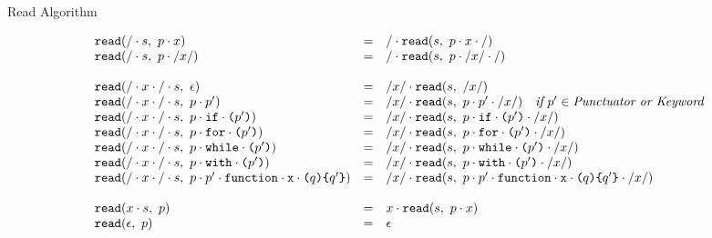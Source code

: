 \documentclass[preprint,10pt]{sigplanconf}
\begin{document}
\begin{displayfigure*}{\label{fig:read}Read Algorithm}
  
\[
  \begin{array}{lcll}
    \texttt{read}(/\cdot s,~p\cdot x)
    &=&
    / \cdot 
      \texttt{read}(s,~
        p\cdot x\cdot /
      )
   
    \\
    \texttt{read}(/\cdot s,~p \cdot /x/)
    &=&
    / \cdot 
      \texttt{read}(s,~
        p \cdot /x/ \cdot /
      )
   

    \\ \\
    \texttt{read}(/\cdot x \cdot /\cdot s,~\epsilon)
    &=&
    /x/ \cdot 
      \texttt{read}(s,~/x/)
   
    \\
    \texttt{read}(/\cdot x \cdot /\cdot s,~p \cdot p')
    &=&
    /x/ \cdot 
      \texttt{read}(s,~
        p \cdot p' \cdot /x/
      )
   
    \quad \textit{if}~p' \in \textit{Punctuator or Keyword}
    \\
    \texttt{read}(/\cdot x \cdot /\cdot s,~p \cdot \texttt{if} \cdot \texttt{(}p'\texttt{)})
    &=&
    /x/ \cdot 
      \texttt{read}(s,~p \cdot \texttt{if} \cdot \texttt{(}p'\texttt{)} \cdot /x/)
   
    \\
    \texttt{read}(/\cdot x \cdot /\cdot s,~p \cdot \texttt{for} \cdot \texttt{(}p'\texttt{)})
    &=&
    /x/ \cdot 
      \texttt{read}(s,~p \cdot \texttt{for} \cdot \texttt{(}p'\texttt{)} \cdot /x/)
   
    \\
    \texttt{read}(/\cdot x \cdot /\cdot s,~p \cdot \texttt{while} \cdot \texttt{(}p'\texttt{)})
    &=&
    /x/ \cdot 
      \texttt{read}(s,~p \cdot \texttt{while} \cdot \texttt{(}p'\texttt{)} \cdot /x/)
   
    \\
    \texttt{read}(/\cdot x \cdot /\cdot s,~p \cdot \texttt{with} \cdot \texttt{(}p'\texttt{)})
    &=&
    /x/ \cdot 
      \texttt{read}(s,~p \cdot \texttt{with} \cdot \texttt{(}p'\texttt{)} \cdot /x/)
   
    \\
    \texttt{read}(/\cdot x \cdot /\cdot s,~
      p \cdot p' \cdot \texttt{function} \cdot \texttt{x} \cdot \texttt{(}q\texttt{)} \texttt{\{}q'\texttt{\}}
    )
    &=&
    /x/ \cdot 
      \texttt{read}(s,~
      p \cdot p' 
      \cdot \texttt{function} \cdot \texttt{x} \cdot \texttt{(}q\texttt{)} \texttt{\{}q'\texttt{\}}\cdot /x/
      )
   

    \\ \\
    
    \texttt{read}(x \cdot s,~p)
    &=&
    x \cdot 
      \texttt{read}(s,~p \cdot x)
   
    \\
    \texttt{read}(\epsilon,~p)
    &=&
    \epsilon
  \end{array}
\]
\end{displayfigure*}
\end{document}

